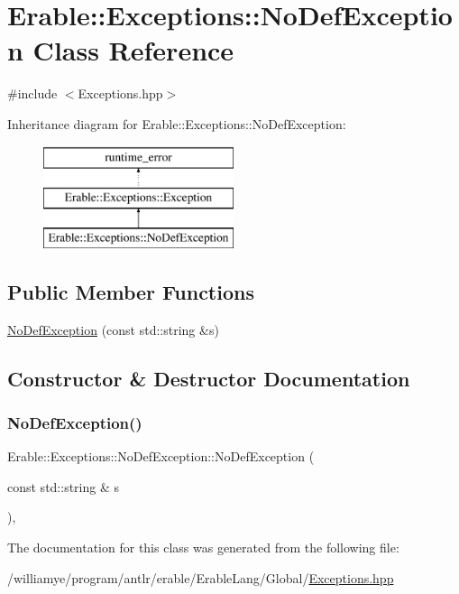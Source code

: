 \hypertarget{class_erable_1_1_exceptions_1_1_no_def_exception}{}\section{Erable\+::Exceptions\+::No\+Def\+Exception Class Reference}
\label{class_erable_1_1_exceptions_1_1_no_def_exception}


{\ttfamily \#include $<$Exceptions.\+hpp$>$}

Inheritance diagram for Erable\+::Exceptions\+::No\+Def\+Exception\+:\begin{figure}[H]
\begin{center}
\leavevmode
\includegraphics[height=3.000000cm]{class_erable_1_1_exceptions_1_1_no_def_exception}
\end{center}
\end{figure}
\subsection*{Public Member Functions}
\begin{DoxyCompactItemize}
\item 
\mbox{\hyperlink{class_erable_1_1_exceptions_1_1_no_def_exception_a2e52a9aee3a3a926d93a8c5a35d8efb6}{No\+Def\+Exception}} (const std\+::string \&s)
\end{DoxyCompactItemize}


\subsection{Constructor \& Destructor Documentation}
\mbox{\label{class_erable_1_1_exceptions_1_1_no_def_exception_a2e52a9aee3a3a926d93a8c5a35d8efb6}} 
\subsubsection{\texorpdfstring{NoDefException()}{NoDefException()}}
{\footnotesize\ttfamily Erable\+::\+Exceptions\+::\+No\+Def\+Exception\+::\+No\+Def\+Exception (\begin{DoxyParamCaption}\item[{const std\+::string \&}]{s }\end{DoxyParamCaption})\hspace{0.3cm}{\ttfamily [inline]}, {\ttfamily [explicit]}}



The documentation for this class was generated from the following file\+:\begin{DoxyCompactItemize}
\item 
/williamye/program/antlr/erable/\+Erable\+Lang/\+Global/\mbox{\hyperlink{_exceptions_8hpp}{Exceptions.\+hpp}}\end{DoxyCompactItemize}
